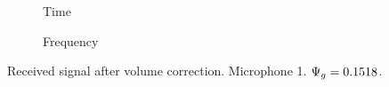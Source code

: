 \begin{figure}[h]
	\centering
	\begin{subfigure}[b]{0.49\textwidth}
		\def\svgwidth{0.9\columnwidth}
		\graphicspath{{Img/}}
		{\fontsize{5}{12}\selectfont
			
		}
		\caption{Time}
	\end{subfigure}
	\begin{subfigure}[b]{0.49\textwidth}
		\def\svgwidth{0.9\columnwidth}
		\graphicspath{{Img/}}
		{\fontsize{5}{12}\selectfont
			
		}
	\caption{Frequency}	
	\end{subfigure}
\caption{Received signal after volume correction. Microphone 1. $\Psi_g = 0.1518$.}
	\label{corrVol}
\end{figure}